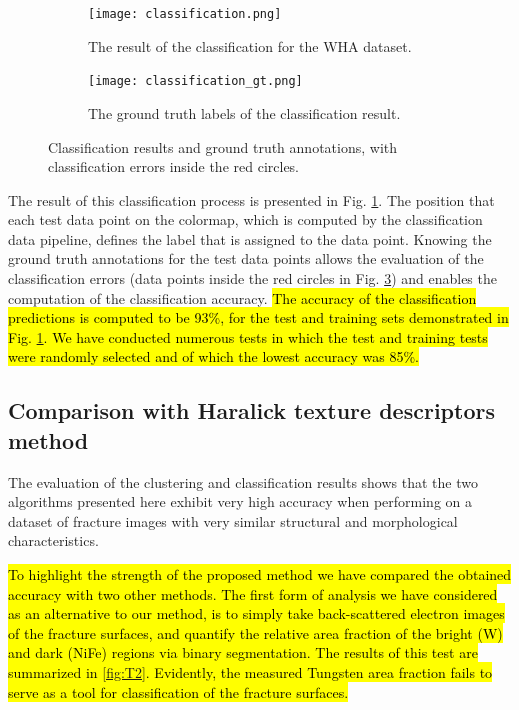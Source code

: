 \documentclass[authoryear,preprint,review,12pt, singleside]{elsarticle}
\begin{document}
\begin{figure}[!h]
	\centering
	\begin{subfigure}[b]{0.49\textwidth}
		\centering
		\texttt{[image: classification.png]}
		\caption{The result of the classification for the WHA dataset.}
		\label{fig:classification}
	\end{subfigure}
	\begin{subfigure}[b]{0.49\textwidth}
		\centering
		\texttt{[image: classification\_gt.png]}
		\caption{The ground truth labels of the classification result.}
		\label{fig:classification_gt}
	\end{subfigure}
	\caption{Classification results and ground truth annotations, with classification errors inside the red circles.}
\end{figure}



The result of this classification process is presented in Fig. \ref{fig:classification}. The position that each test data point on the colormap, which is computed by the classification data pipeline, defines the label that is assigned to the data point. Knowing the ground truth annotations for the test data points allows the evaluation of the classification errors (data points inside the red circles in Fig. \ref{fig:classification_gt}) and enables the computation of the classification accuracy. \hl{The accuracy of the classification predictions is computed to be 93\%, for the test and training sets demonstrated in Fig. {\ref{fig:classification}}. We have conducted numerous tests in which the test and training tests were randomly selected and of which the lowest accuracy was 85\%.} 


\subsection{Comparison with Haralick texture descriptors method}

The evaluation of the clustering and classification results shows that the two algorithms presented here exhibit very high accuracy when performing on a dataset of fracture images with very similar structural and morphological characteristics. 

\hl{To highlight the strength of the proposed method we have compared the obtained accuracy with two other methods. The first form of analysis we have considered as an alternative to our method, is to simply take back-scattered electron images of the fracture surfaces, and quantify the relative area fraction of the bright (W) and dark (NiFe) regions via binary segmentation. The results of this test are summarized in {\ref{fig:T2}}. Evidently, the measured Tungsten area fraction fails to serve as a tool for classification of the fracture surfaces. }
\end{document}
